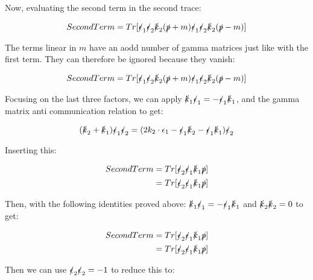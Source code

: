 \documentclass[a4]{article}
\begin{document}
    Now, evaluating the second term in the second trace:

    \begin{equation}
        Second Term = Tr [\slashed{\epsilon}_1 \slashed{\epsilon}_2 \slashed{k}_2 (\slashed{p} + m) \slashed{\epsilon}_1 \slashed{\epsilon}_2 \slashed{k}_2 (\slashed{p} - m)]
    \end{equation}

    The terms linear in $m$ have an aodd number of gamma matrices just like with the first term. They can therefore be ignored because they vanish:

    \begin{equation}
        Second Term = Tr [\slashed{\epsilon}_1 \slashed{\epsilon}_2 \slashed{k}_2 (\slashed{p} + m) \slashed{\epsilon}_1 \slashed{\epsilon}_2 \slashed{k}_2 (\slashed{p} - m)]
    \end{equation}

    Focusing on the last three factors, we can apply $\slashed{k}_1 \slashed{\epsilon}_1 = - \slashed{\epsilon}_1 \slashed{k}_1$, and the gamma matrix anti communication relation to get:

    \begin{equation}
        (\slashed{k}_2 + \slashed{k}_1) \slashed{\epsilon}_1 \slashed{\epsilon}_2 = (2 k_2 \cdot \epsilon_1 - \slashed{\epsilon}_1 \slashed{k}_2 - \slashed{\epsilon}_1 \slashed{k}_1) \slashed{\epsilon}_2
    \end{equation}

    Inserting this:

    \begin{eqnarray}
        Second Term = Tr [\slashed{\epsilon}_2 \slashed{\epsilon}_1 \slashed{k}_1 \slashed{p}] \\
        = Tr [\slashed{\epsilon}_2 \slashed{\epsilon}_1 \slashed{k}_1 \slashed{p}]
    \end{eqnarray}

    Then, with the following identities proved above: $\slashed{k}_1 \slashed{\epsilon}_1 = - \slashed{\epsilon}_1 \slashed{k}_1$ and $\slashed{k}_2 \slashed{k}_2 = 0$ to get:

    \begin{eqnarray}
        Second Term = Tr [\slashed{\epsilon}_2 \slashed{\epsilon}_1 \slashed{k}_1 \slashed{p}] \\
        = Tr [\slashed{\epsilon}_2 \slashed{\epsilon}_1 \slashed{k}_1 \slashed{p}]
    \end{eqnarray}

    Then we can use $\slashed{\epsilon}_2 \slashed{\epsilon}_2 = - 1$ to reduce this to:
\end{document}
